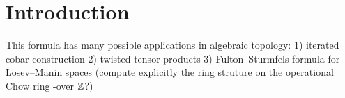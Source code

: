 
\section*{Introduction} 
\label{s:introduction}

This formula has many possible applications in algebraic topology: 1) iterated cobar construction 2) twisted tensor products 3) Fulton--Sturmfels formula for Losev--Manin spaces (compute explicitly the ring struture on the operational Chow ring -over $\mathbb Z$?)





